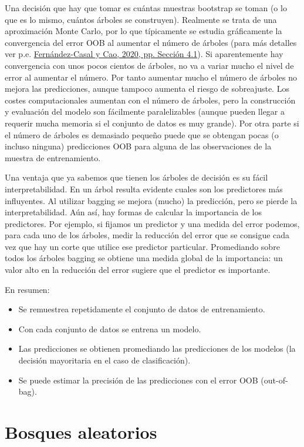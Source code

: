 \documentclass[
  spanish,
]{book}
\theoremstyle{break}
\theoremstyle{definition}
\theoremstyle{definition}
\theoremstyle{definition}
\theoremstyle{definition}
\theoremstyle{remark}
\begin{document}
Una decisión que hay que tomar es cuántas muestras bootstrap se toman (o lo que es lo mismo, cuántos árboles se construyen).
Realmente se trata de una aproximación Monte Carlo, por lo que típicamente se estudia gráficamente la convergencia del error OOB al aumentar el número de árboles (para más detalles ver p.e. \protect\hyperlink{ref-fernandez2020simbook}{Fernández-Casal y Cao, 2020, pp. Sección 4.1}).
Si aparentemente hay convergencia con unos pocos cientos de árboles, no va a variar mucho el nivel de error al aumentar el número.
Por tanto aumentar mucho el número de árboles no mejora las predicciones, aunque tampoco aumenta el riesgo de sobreajuste.
Los costes computacionales aumentan con el número de árboles, pero la construcción y evaluación del modelo son fácilmente paralelizables (aunque pueden llegar a requerir mucha memoria si el conjunto de datos es muy grande).
Por otra parte si el número de árboles es demasiado pequeño puede que se obtengan pocas (o incluso ninguna) predicciones OOB para alguna de las observaciones de la muestra de entrenamiento.

Una ventaja que ya sabemos que tienen los árboles de decisión es su fácil interpretabilidad.
En un árbol resulta evidente cuales son los predictores más influyentes.
Al utilizar bagging se mejora (mucho) la predicción, pero se pierde la interpretabilidad.
Aún así, hay formas de calcular la importancia de los predictores.
Por ejemplo, si fijamos un predictor y una medida del error podemos, para cada uno de los árboles, medir la reducción del error que se consigue cada vez que hay un corte que utilice ese predictor particular.
Promediando sobre todos los árboles bagging se obtiene una medida global de la importancia: un valor alto en la reducción del error sugiere que el predictor es importante.

En resumen:

\begin{itemize}
\item
  Se remuestrea repetidamente el conjunto de datos de entrenamiento.
\item
  Con cada conjunto de datos se entrena un modelo.
\item
  Las predicciones se obtienen promediando las predicciones de los
  modelos (la decisión mayoritaria en el caso de clasificación).
\item
  Se puede estimar la precisión de las predicciones con el error OOB (out-of-bag).
\end{itemize}

\hypertarget{bosques-aleatorios}{%
\section{Bosques aleatorios}\label{bosques-aleatorios}}
\end{document}
